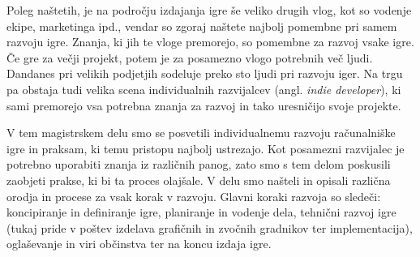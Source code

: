 \documentclass[12pt,a4paper,twoside]{book}
\begin{document}
Poleg naštetih, je na področju izdajanja igre še veliko drugih vlog, kot so vodenje ekipe, marketinga ipd., vendar so zgoraj naštete najbolj pomembne pri samem razvoju igre. Znanja, ki jih te vloge premorejo, so pomembne za razvoj vsake igre. Če gre za večji projekt, potem je za posamezno vlogo potrebnih več ljudi. Dandanes pri velikih podjetjih sodeluje preko sto ljudi pri razvoju iger. Na trgu pa obstaja tudi velika scena individualnih razvijalcev (angl. \textit{indie developer}), ki sami premorejo vsa potrebna znanja za razvoj in tako uresničijo svoje projekte. 

V tem magistrskem delu smo se posvetili individualnemu razvoju računalniške igre in praksam, ki temu pristopu najbolj ustrezajo. Kot posamezni razvijalec je potrebno uporabiti znanja iz različnih panog, zato smo s tem delom poskusili zaobjeti prakse, ki bi ta proces olajšale. V delu smo našteli in opisali različna orodja in procese za vsak korak v razvoju. Glavni koraki razvoja so sledeči: koncipiranje in definiranje igre, planiranje in vodenje dela, tehnični razvoj igre (tukaj pride v poštev izdelava grafičnih in zvočnih gradnikov ter implementacija), oglaševanje in viri občinstva ter na koncu izdaja igre.
\end{document}
